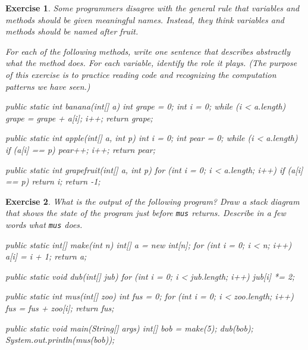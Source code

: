 \documentclass[12pt]{book}
\theoremstyle{exercise}
\newtheorem{exercise}{Exercise}[chapter]
\newcommand{\java}[1]{\verb"#1"}
\newcommand{\java}[1]{\lstinline{#1}} %
\begin{document}
\begin{exercise}
Some programmers disagree with the general rule that variables and methods should be given meaningful names.
Instead, they think variables and methods should be named after fruit.

For each of the following methods, write one sentence that describes abstractly what the method does.
For each variable, identify the role it plays.
(The purpose of this exercise is to practice reading code and recognizing the computation patterns we have seen.)


\begin{code}
    public static int banana(int[] a) {
        int grape = 0;
        int i = 0;
        while (i < a.length) {
            grape = grape + a[i];
            i++;
        }
        return grape;
    }
\end{code}

\begin{code}
    public static int apple(int[] a, int p) {
        int i = 0;
        int pear = 0;
        while (i < a.length) {
            if (a[i] == p) {
                pear++;
            }
            i++;
        }
        return pear;
    }
\end{code}

\begin{code}
    public static int grapefruit(int[] a, int p) {
        for (int i = 0; i < a.length; i++) {
            if (a[i] == p) {
                return i;
            }
        }
        return -1;
    }
\end{code}
\end{exercise}


\begin{exercise}
What is the output of the following program?
Draw a stack diagram that shows the state of the program just before \java{mus} returns.
Describe in a few words what \java{mus} does.

\begin{code}
    public static int[] make(int n) {
        int[] a = new int[n];
        for (int i = 0; i < n; i++) {
            a[i] = i + 1;
        }
        return a;
    }
\end{code}

\begin{code}
    public static void dub(int[] jub) {
        for (int i = 0; i < jub.length; i++) {
            jub[i] *= 2;
        }
    }
\end{code}

\begin{code}
    public static int mus(int[] zoo) {
        int fus = 0;
        for (int i = 0; i < zoo.length; i++) {
            fus = fus + zoo[i];
        }
        return fus;
    }
\end{code}

\begin{code}
    public static void main(String[] args) {
        int[] bob = make(5);
        dub(bob);
        System.out.println(mus(bob));
    }
\end{code}
\end{exercise}
\end{document}
